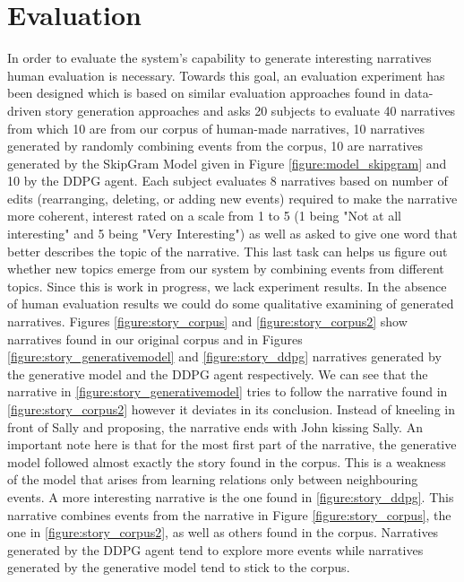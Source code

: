 \documentclass[11pt,letterpaper]{article}
\begin{document}
\section{Evaluation}

In order to evaluate the system's capability to generate interesting narratives human evaluation is necessary. Towards this goal, an evaluation experiment has been designed which is based on similar evaluation approaches found in data-driven story generation approaches \cite{li2013story,mcintyre2010plot} and asks 20 subjects to evaluate 40 narratives from which 10 are from our corpus of human-made narratives, 10 narratives generated by randomly combining events from the corpus, 10 are narratives generated by the SkipGram Model given in Figure \ref{figure:model_skipgram} and 10 by the DDPG agent. Each subject evaluates 8 narratives based on number of edits (rearranging, deleting, or adding new events) required to make the narrative more coherent, interest rated on a scale from 1 to 5 (1 being "Not at all interesting" and 5 being "Very Interesting") as well as asked to give one word that better describes the topic of the narrative. This last task can helps us figure out whether new topics emerge from our system by combining events from different topics. Since this is work in progress, we lack experiment results. In the absence of human evaluation results we could do some qualitative examining of generated narratives. Figures \ref{figure:story_corpus} and \ref{figure:story_corpus2} show narratives found in our original corpus and in Figures \ref{figure:story_generativemodel} and \ref{figure:story_ddpg} narratives generated by the generative model and the DDPG agent respectively. We can see that the narrative in \ref{figure:story_generativemodel} tries to follow the narrative found in \ref{figure:story_corpus2} however it deviates in its conclusion. Instead of kneeling in front of Sally and proposing, the narrative ends with John kissing Sally. An important note here is that for the most first part of the narrative, the generative model followed almost exactly the story found in the corpus. This is a weakness of the model that arises from learning relations only between neighbouring events. A more interesting narrative is the one found in \ref{figure:story_ddpg}. This narrative combines events from the narrative in Figure \ref{figure:story_corpus}, the one in \ref{figure:story_corpus2}, as well as others found in the corpus. Narratives generated by the DDPG agent tend to explore more events while narratives generated by the generative model tend to stick to the corpus.
 
\end{document}
